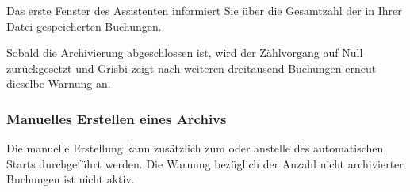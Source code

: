 Das erste Fenster des Assistenten  informiert Sie über die Gesamtzahl der in Ihrer Datei gespeicherten Buchungen.

Sobald die Archivierung abgeschlossen ist, wird der Zählvorgang auf Null zurückgesetzt und Grisbi zeigt nach weiteren dreitausend Buchungen erneut dieselbe Warnung an.


\subsubsection{Manuelles Erstellen eines Archivs\label{datamanagement-archive-manu}}

Die manuelle Erstellung kann zusätzlich zum oder anstelle des automatischen Starts durchgeführt werden. Die Warnung bezüglich der Anzahl nicht archivierter Buchungen ist nicht aktiv.


